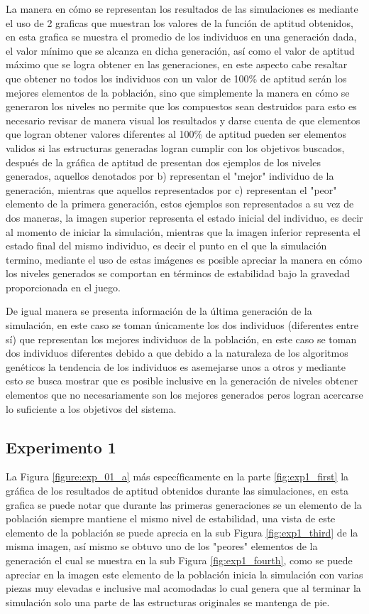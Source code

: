 La manera en cómo se representan los resultados de las simulaciones es mediante
el uso de 2 graficas que muestran los valores de la función de aptitud
obtenidos, en esta grafica se muestra el promedio de los individuos en una
generación dada, el valor mínimo que se alcanza en dicha generación, así como el
valor de aptitud máximo que se logra obtener en las generaciones, en este
aspecto cabe resaltar que obtener no todos los individuos con un valor de 100\%
de aptitud serán los mejores elementos de la población, sino que simplemente la
manera en cómo se generaron los niveles no permite que los compuestos sean
destruidos para esto es necesario revisar de manera visual los resultados y
darse cuenta de que elementos que logran obtener valores diferentes al 100\% de
aptitud pueden ser elementos validos si las estructuras generadas logran cumplir
con los objetivos buscados, después de la gráfica de aptitud de presentan dos
ejemplos de los niveles generados, aquellos denotados por b) representan el
"mejor" individuo de la generación, mientras que aquellos representados por c)
representan el "peor" elemento de la primera generación, estos ejemplos son
representados a su vez de dos maneras, la imagen superior representa el estado
inicial del individuo, es decir al momento de iniciar la simulación, mientras
que la imagen inferior representa el estado final del mismo individuo, es decir
el punto en el que la simulación termino, mediante el uso de estas imágenes es
posible apreciar la manera en cómo los niveles generados se comportan en
términos de estabilidad bajo la gravedad proporcionada en el juego.

De igual manera se presenta información de la última generación de la
simulación, en este caso se toman únicamente los dos individuos (diferentes
entre sí) que representan los mejores individuos de la población, en este caso
se toman dos individuos diferentes debido a que debido a la naturaleza de los
algoritmos genéticos la tendencia de los individuos es asemejarse unos a otros y
mediante esto se busca mostrar que es posible inclusive en la generación de
niveles obtener elementos que no necesariamente son los mejores generados peros
logran acercarse lo suficiente a los objetivos del sistema.

\subsection{Experimento 1}
\label{chap6:exp_1}

La Figura \ref{figure:exp_01_a} más específicamente en la parte
\ref{fig:exp1_first} la gráfica de los resultados de aptitud obtenidos durante
las simulaciones, en esta grafica se puede notar que durante las primeras
generaciones se un elemento de la población siempre mantiene el mismo nivel de
estabilidad, una vista de este elemento de la población se puede aprecia en la
sub Figura \ref{fig:exp1_third} de la misma imagen, así mismo se obtuvo uno de
los "peores" elementos de la generación el cual se muestra en la sub Figura
\ref{fig:exp1_fourth}, como se puede apreciar en la imagen este elemento de la
población inicia la simulación con varias piezas muy elevadas e inclusive mal
acomodadas lo cual genera que al terminar la simulación solo una parte de las
estructuras originales se mantenga de pie.

